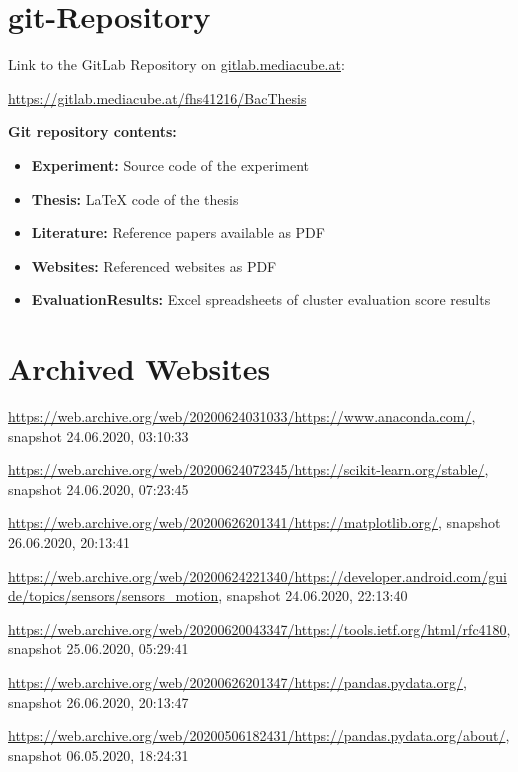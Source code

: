 \begin{appendices}

\section{git-Repository}



Link to the GitLab Repository on {\url{gitlab.mediacube.at}}:

{\color{red}\url{https://gitlab.mediacube.at/fhs41216/BacThesis}}


\textbf{Git repository contents:}

\begin{itemize}
	\item \textbf{Experiment:} Source code of the experiment
	\item \textbf{Thesis:} LaTeX code of the thesis
	\item \textbf{Literature:} Reference papers available as PDF
	\item \textbf{Websites:} Referenced websites as PDF
	\item \textbf{EvaluationResults:} Excel spreadsheets of cluster evaluation score results
\end{itemize}



\section{Archived Websites}
\label{appendix:archivedWebsites}
\sloppy
\url{https://web.archive.org/web/20200624031033/https://www.anaconda.com/}, snapshot 24.06.2020, 03:10:33

\url{https://web.archive.org/web/20200624072345/https://scikit-learn.org/stable/}, snapshot 24.06.2020, 07:23:45

\url{https://web.archive.org/web/20200626201341/https://matplotlib.org/}, snapshot 26.06.2020, 20:13:41

\url{https://web.archive.org/web/20200624221340/https://developer.android.com/guide/topics/sensors/sensors_motion}, snapshot 24.06.2020, 22:13:40

\url{https://web.archive.org/web/20200620043347/https://tools.ietf.org/html/rfc4180}, snapshot 25.06.2020, 05:29:41

\url{https://web.archive.org/web/20200626201347/https://pandas.pydata.org/}, snapshot 26.06.2020, 20:13:47

\url{https://web.archive.org/web/20200506182431/https://pandas.pydata.org/about/}, snapshot 06.05.2020, 18:24:31


\end{appendices}
